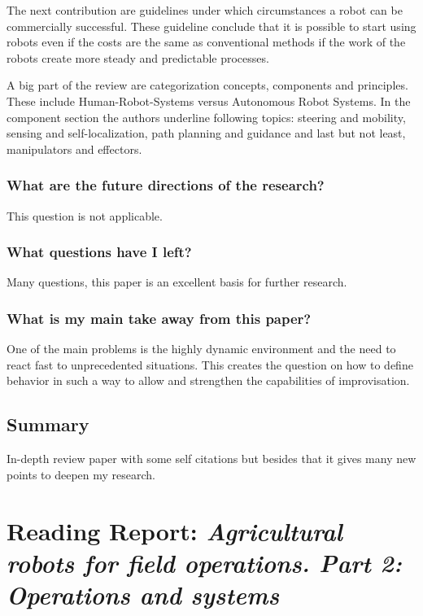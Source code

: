     The next contribution are guidelines under which circumstances a robot can be commercially successful. These guideline conclude
    that it is possible to start using robots even if the costs are the same as conventional methods if the work of
    the robots create more steady and predictable processes.
    
    A big part of the review are categorization concepts, components and principles. These include Human-Robot-Systems versus
    Autonomous Robot Systems. In the component section the authors underline following topics: steering and mobility, 
    sensing and self-localization, path planning and guidance and last but not least, manipulators and effectors.
    \subsubsection*{What are the future directions of the research?}
    This question is not applicable.
    \subsubsection*{What questions have I left?}
    Many questions, this paper is an excellent basis for further research.
    \subsubsection*{What is my main take away from this paper?}
    One of the main problems is the highly dynamic environment and the need to react fast to unprecedented situations.
    This creates the question on how to define behavior in such a way to allow and strengthen the capabilities of 
    improvisation.
    \subsection*{Summary}
    In-depth review paper with some self citations but besides that it gives many new points to deepen my research.
    
    \newpage
    \section{Reading Report: \emph{Agricultural robots for field operations. Part 2: Operations and systems}}
    \label{sec:Bechar2017}
    \cite{Bechar2017}

